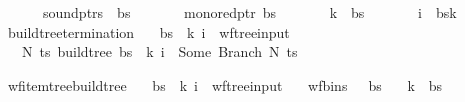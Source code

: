 \begin{isabellebody}
\ \ \ \ \ \ sound{\isacharunderscore}{\kern0pt}ptrs\ {\isasymomega}\ bs\ {\isasymand}\isanewline
\ \ \ \ \ \ mono{\isacharunderscore}{\kern0pt}red{\isacharunderscore}{\kern0pt}ptr\ bs\ {\isasymand}\isanewline
\ \ \ \ \ \ k\ {\isacharless}{\kern0pt}\ {\isacharbar}{\kern0pt}bs{\isacharbar}{\kern0pt}\ {\isasymand}\isanewline
\ \ \ \ \ \ i\ {\isacharless}{\kern0pt}\ {\isacharbar}{\kern0pt}bs{\isacharbang}{\kern0pt}k{\isacharbar}{\kern0pt}\isanewline
\ \ {\isacharbraceright}{\kern0pt}{\isachardoublequoteclose}\isanewline
\isanewline
{}\isamarkupfalse%
\ build{\isacharunderscore}{\kern0pt}tree{\isacharprime}{\kern0pt}{\isacharunderscore}{\kern0pt}termination{\isacharcolon}{\kern0pt}\isanewline
\ \ \ {\isachardoublequoteopen}{\isacharparenleft}{\kern0pt}bs{\isacharcomma}{\kern0pt}\ {\isasymomega}{\isacharcomma}{\kern0pt}\ k{\isacharcomma}{\kern0pt}\ i{\isacharparenright}{\kern0pt}\ {\isasymin}\ wf{\isacharunderscore}{\kern0pt}tree{\isacharunderscore}{\kern0pt}input{\isachardoublequoteclose}\isanewline
\ \ \ {\isachardoublequoteopen}{\isasymexists}N\ ts{\isachardot}{\kern0pt}\ build{\isacharunderscore}{\kern0pt}tree{\isacharprime}{\kern0pt}\ bs\ {\isasymomega}\ k\ i\ {\isacharequal}{\kern0pt}\ Some\ {\isacharparenleft}{\kern0pt}Branch\ N\ ts{\isacharparenright}{\kern0pt}{\isachardoublequoteclose}%
\isadelimproof
%
\endisadelimproof
%
\isatagproof
%
\endisatagproof
{\isafoldproof}%
%
\isadelimproof
%
\endisadelimproof
%
\begin{isamarkuptext}%
%
\end{isamarkuptext}\isamarkuptrue%
%
\isadelimdocument
%
\endisadelimdocument
%
\isatagdocument
%
\isamarkuptrue%
%
\endisatagdocument
{\isafolddocument}%
%
\isadelimdocument
%
\endisadelimdocument
{}\isamarkupfalse%
\ wf{\isacharunderscore}{\kern0pt}item{\isacharunderscore}{\kern0pt}tree{\isacharunderscore}{\kern0pt}build{\isacharunderscore}{\kern0pt}tree{\isacharprime}{\kern0pt}{\isacharcolon}{\kern0pt}\isanewline
\ \ \ {\isachardoublequoteopen}{\isacharparenleft}{\kern0pt}bs{\isacharcomma}{\kern0pt}\ {\isasymomega}{\isacharcomma}{\kern0pt}\ k{\isacharcomma}{\kern0pt}\ i{\isacharparenright}{\kern0pt}\ {\isasymin}\ wf{\isacharunderscore}{\kern0pt}tree{\isacharunderscore}{\kern0pt}input{\isachardoublequoteclose}\isanewline
\ \ \ {\isachardoublequoteopen}wf{\isacharunderscore}{\kern0pt}bins\ {\isasymG}\ {\isasymomega}\ bs{\isachardoublequoteclose}\isanewline
\ \ \ {\isachardoublequoteopen}k\ {\isacharless}{\kern0pt}\ {\isacharbar}{\kern0pt}bs{\isacharbar}{\kern0pt}{\isachardoublequoteclose}\isanewline

\end{isabellebody}
